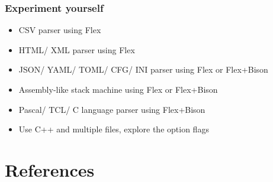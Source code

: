 \documentclass{beamer}
\begin{document}
\begin{frame}
    \frametitle{Experiment yourself}
    
    \begin{itemize}
        \item CSV parser using Flex
        \item HTML/ XML parser using Flex
        \item JSON/ YAML/ TOML/ CFG/ INI parser using Flex or Flex+Bison
        \item Assembly-like stack machine using Flex or Flex+Bison
        \item Pascal/ TCL/ C language parser using Flex+Bison
        \item Use C++ and multiple files, explore the option flags
    \end{itemize}
\end{frame}

\section{References}

\begin{frame}
    \nocite{*}
    
    {\tiny  }
\end{frame}

\end{document}

